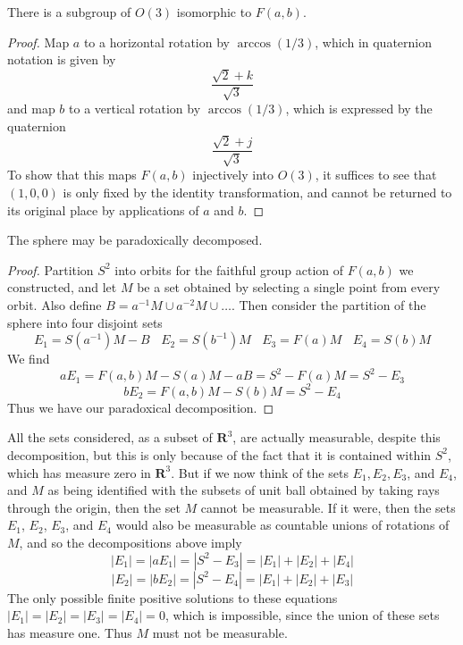 \begin{lemma}
    There is a subgroup of $O(3)$ isomorphic to $F(a,b)$.
\end{lemma}
\begin{proof}
    Map $a$ to a horizontal rotation by $\arccos(1/3)$, which in quaternion notation is given by
    \[ \frac{\sqrt{2} + k}{\sqrt{3}} \]
    and map $b$ to a vertical rotation by $\arccos(1/3)$, which is expressed by the quaternion
    \[ \frac{\sqrt{2} + j}{\sqrt{3}} \]
    To show that this maps $F(a,b)$ injectively into $O(3)$, it suffices to see that $(1,0,0)$ is only fixed by the identity transformation, and cannot be returned to its original place by applications of $a$ and $b$.
\end{proof}

\begin{theorem}
    The sphere may be paradoxically decomposed.
\end{theorem}
\begin{proof}
  Partition $S^2$ into orbits for the faithful group action of $F(a,b)$ we constructed, and let $M$ be a set obtained by selecting a single point from every orbit. Also define $B = a^{-1}M \cup a^{-2}M \cup \dots$. Then consider the partition of the sphere into four disjoint sets
  \[ E_1 = S(a^{-1})M - B \ \ \ \ E_2 = S(b^{-1})M\ \ \ \ E_3 = F(a) M\ \ \ \ E_4 = S(b)M \]
  We find
  \[ aE_1 = F(a,b)M - S(a)M - aB = S^2 - F(a)M = S^2 - E_3 \]
  \[ bE_2 = F(a,b)M - S(b)M = S^2 - E_4 \]
  Thus we have our paradoxical decomposition.
\end{proof}

All the sets considered, as a subset of $\mathbf{R}^3$, are actually measurable, despite this decomposition, but this is only because of the fact that it is contained within $S^2$, which has measure zero in $\mathbf{R}^3$. But if we now think of the sets $E_1, E_2, E_3$, and $E_4$, and $M$ as being identified with the subsets of unit ball obtained by taking rays through the origin, then the set $M$ cannot be measurable. If it were, then the sets $E_1$, $E_2$, $E_3$, and $E_4$ would also be measurable as countable unions of rotations of $M$, and so the decompositions above imply
%
\[ |E_1| = |aE_1| = |S^2 - E_3| = |E_1| + |E_2| + |E_4| \]
\[ |E_2| = |bE_2| = |S^2 - E_4| = |E_1| + |E_2| + |E_3| \]
%
The only possible finite positive solutions to these equations $|E_1| = |E_2| = |E_3| = |E_4| = 0$, which is impossible, since the union of these sets has measure one. Thus $M$ must not be measurable.

